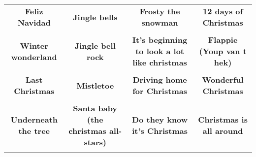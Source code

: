 \documentclass[12pt]{article} \usepackage{eso-pic, graphicx}
\newcommand{\background}[1]{%
\AddToShipoutPictureBG*{\texttt{[image: \#1]}}
}
\begin{document}
\tabcolsep=30.2pt \renewcommand{\arraystretch}{4.5}   \vspace*{4.3cm} \begin{center}  \begin{tabular}{c c c c}
\parbox{3cm}{\centering \textbf{Feliz Navidad}}& 
\parbox{3cm}{\centering \textbf{Jingle bells}}& 
\parbox{3cm}{\centering \textbf{Frosty the snowman}}& 
\parbox{3cm}{\centering \textbf{12 days of Christmas}}\\ \\ 
\parbox{3cm}{\centering \textbf{Winter wonderland}}& 
\parbox{3cm}{\centering \textbf{Jingle bell rock}}& 
\parbox{3cm}{\centering \textbf{It’s beginning to look a lot like christmas}}& 
\parbox{3cm}{\centering \textbf{Flappie (Youp van t hek)}}\\ \\ 
\parbox{3cm}{\centering \textbf{Last Christmas}}& 
\parbox{3cm}{\centering \textbf{Mistletoe}}& 
\parbox{3cm}{\centering \textbf{Driving home for Christmas}}& 
\parbox{3cm}{\centering \textbf{Wonderful Christmas}}\\ \\ 
\parbox{3cm}{\centering \textbf{Underneath the tree}}& 
\parbox{3cm}{\centering \textbf{Santa baby (the christmas all-stars)}}& 
\parbox{3cm}{\centering \textbf{Do they know it's Christmas}}& 
\parbox{3cm}{\centering \textbf{Christmas is all around}}\\ \\ 
\end{tabular} \background{discobingo.pdf} \end{center} 
\end{document}
